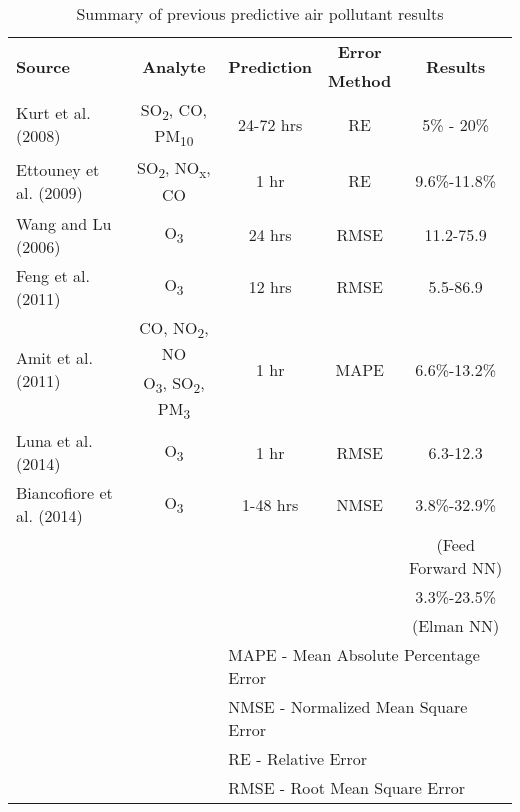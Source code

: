 \begin{table}[H]
\centering
\caption{Summary of previous predictive air pollutant results}
\label{tb:priorANNresults}
\begin{tabular}{@{}lcccc@{}}
\toprule
\multirow{2}{*}{\textbf{Source}} & \multirow{2}{*}{\textbf{Analyte}} & \multirow{2}{*}{\textbf{Prediction}} & \textbf{Error} & \multirow{2}{*}{\textbf{Results}} \\
 &  &  & \multicolumn{1}{l}{\textbf{Method}} &  \\ \hline
Kurt et al. (2008) & SO\textsubscript{2}, CO, PM\textsubscript{10} & 24-72 hrs & RE & 5\% - 20\% \\
Ettouney et al. (2009) & SO\textsubscript{2}, NO\textsubscript{x}, CO & 1 hr & RE & 9.6\%-11.8\% \\
Wang and Lu (2006) & O\textsubscript{3} & 24 hrs & RMSE & 11.2-75.9 \\
Feng et al. (2011) & O\textsubscript{3} & 12 hrs & RMSE & 5.5-86.9 \\
\multirow{2}{*}{Amit et al. (2011)} & CO, NO\textsubscript{2}, NO & \multirow{2}{*}{1 hr} & \multirow{2}{*}{MAPE} & \multirow{2}{*}{6.6\%-13.2\%} \\
 & O\textsubscript{3}, SO\textsubscript{2}, PM\textsubscript{3} &  &  &  \\
Luna et al. (2014) & O\textsubscript{3} & 1 hr & RMSE & 6.3-12.3 \\
Biancofiore et al. (2014) & O\textsubscript{3} & 1-48 hrs & NMSE & 3.8\%-32.9\% \\
 &  &  &  & (Feed Forward NN) \\
 &  &  &  & 3.3\%-23.5\% \\
 &  &  &  & (Elman NN)\\ \bottomrule
 &  & \multicolumn{3}{l}{MAPE - Mean Absolute Percentage Error} \\
 &  & \multicolumn{3}{l}{NMSE - Normalized Mean Square Error} \\
 &  & \multicolumn{3}{l}{RE - Relative Error}   \\
 &  & \multicolumn{3}{l}{RMSE - Root Mean Square Error}
\end{tabular}
\end{table}